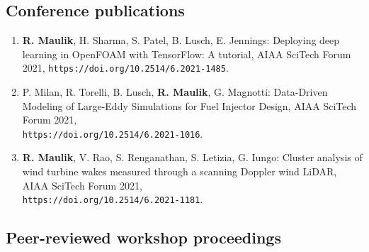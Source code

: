 \documentclass[letterpaper]{article}
\begin{document}
\subsection*{Conference publications}

\begin{enumerate}

\item \textbf{R. Maulik}, H. Sharma, S. Patel, B. Lusch, E. Jennings: Deploying deep learning in OpenFOAM with TensorFlow: A tutorial, AIAA SciTech Forum 2021, \texttt{https://doi.org/10.2514/6.2021-1485}.

\item P. Milan, R. Torelli, B. Lusch, \textbf{R. Maulik}, G. Magnotti: Data-Driven Modeling of Large-Eddy Simulations for Fuel Injector Design, AIAA SciTech Forum 2021, \\ \texttt{https://doi.org/10.2514/6.2021-1016}.

\item \textbf{R. Maulik}, V. Rao, S. Renganathan, S. Letizia, G. Iungo: Cluster analysis of wind turbine wakes measured through a scanning Doppler wind LiDAR, AIAA SciTech Forum 2021, \\ \texttt{https://doi.org/10.2514/6.2021-1181}.

\end{enumerate}

\subsection*{Peer-reviewed workshop proceedings}
\end{document}
